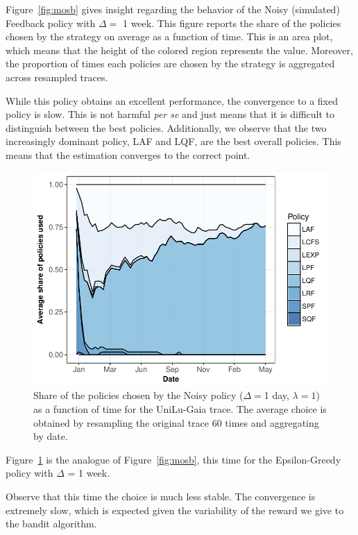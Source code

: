 \documentclass[sigconf,anonymous]{acmart}
\begin{document}
Figure~\ref{fig:mosb} gives insight regarding the behavior of the Noisy
(simulated) Feedback policy with $\Delta=$ 1 week. This figure reports the
share of the policies chosen by the strategy on average as a function of time.
This is an area plot, which means that the height of the colored region
represents the value. Moreover, the proportion of times each policies are
chosen by the strategy is aggregated across resampled traces.

While this policy obtains an excellent performance, the convergence to a fixed
policy is slow. This is not harmful \textit{per se} and just means that it is
difficult to distinguish between the best policies. Additionally, we observe that
the two increasingly dominant policy, LAF and LQF, are the best overall policies.
This means that the estimation converges to the correct point.

\begin{figure}[]
  \centering
  \includegraphics[scale=0.6]{figures/mosaic-UniLu-Ga.pdf}

  \caption{Share of the policies chosen by the Noisy policy ($\Delta=$1 day,
  $\lambda = 1 $) as a function of time
    for the UniLu-Gaia trace. The average choice
  is obtained by resampling the original trace 60 times and aggregating by
  date.}

  \label{fig:mosn}
\end{figure}

Figure~\ref{fig:mosn} is the analogue of Figure~\ref{fig:mosb}, this time for
the Epsilon-Greedy policy with $\Delta$ = 1 week.

Observe that this time the choice is much less stable. The convergence is
extremely slow, which is expected given the variability of the reward we give
to the bandit algorithm.
\end{document}
